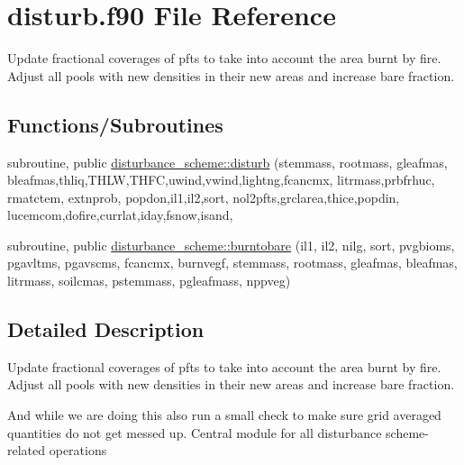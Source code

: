 \hypertarget{disturb_8f90}{}\section{disturb.\+f90 File Reference}
\label{disturb_8f90}


Update fractional coverages of pfts to take into account the area burnt by fire. Adjust all pools with new densities in their new areas and increase bare fraction.  


\subsection*{Functions/\+Subroutines}
{\bf }\par
\begin{DoxyCompactItemize}
\item 
subroutine, public \hyperlink{group__disturbance__scheme__disturb_ga43f1709a7ea90ed6c9c37f54c2f5478b}{disturbance\+\_\+scheme\+::disturb} (stemmass, rootmass, gleafmas, bleafmas,thliq,T\+H\+L\+W,T\+H\+F\+C,uwind,vwind,lightng,fcancmx, litrmass,prbfrhuc, rmatctem, extnprob, popdon,il1,il2,sort, nol2pfts,grclarea,thice,popdin, lucemcom,dofire,currlat,iday,fsnow,isand,
\end{DoxyCompactItemize}

{\bf }\par
\begin{DoxyCompactItemize}
\item 
subroutine, public \hyperlink{group__disturbance__scheme__burntobare_gae72fa0c94541c3e88a45d71f2442be9c}{disturbance\+\_\+scheme\+::burntobare} (il1, il2, nilg, sort, pvgbioms, pgavltms, pgavscms, fcancmx, burnvegf, stemmass, rootmass, gleafmas, bleafmas, litrmass, soilcmas, pstemmass, pgleafmass, nppveg)
\end{DoxyCompactItemize}



\subsection{Detailed Description}
Update fractional coverages of pfts to take into account the area burnt by fire. Adjust all pools with new densities in their new areas and increase bare fraction. 

And while we are doing this also run a small check to make sure grid averaged quantities do not get messed up. Central module for all disturbance scheme-\/related operations 